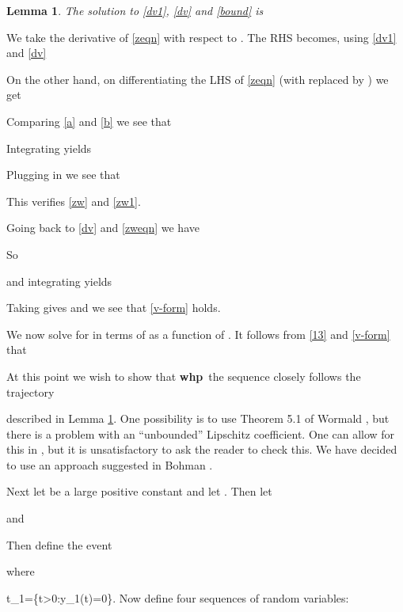 \documentclass[11pt]{article}
\newenvironment{proof}{{\bf Proof:}}{\hfill\mbox{}}
\def\whp{{\bf whp}}
\newcommand{\set}[1]{\left\{#1\right\}}
\newcommand{\ignore}[1]{}
\newtheorem{lemma}[theorem]{Lemma}
\newcommand{\beq}[1]{}
\begin{document}
\begin{lemma}\label{lemde}
The solution to \eqref{dv1}, \eqref{dv} and \eqref{bound} is

\end{lemma}
\begin{proof}
We take the derivative of \eqref{zeqn} with respect to .
The RHS becomes, using \eqref{dv1} and \eqref{dv}
 

On the other hand, on differentiating the LHS of \eqref{zeqn} (with  replaced by ) we get


Comparing \eqref{a} and \eqref{b} we see that


Integrating yields


Plugging in  we see that 

This verifies \eqref{zw} and \eqref{zw1}.

Going back to \eqref{dv} and \eqref{zweqn} we have 

So 
 
and integrating yields

Taking  gives 
and we see that \eqref{v-form} holds.

{\large
{\bf
\ignore{
Using \eqref{v-form} in \eqref{dv1} we get

Dividing through by  we get

and dividing by  and collecting  on LHS gives

Integrating with respect to  and pluggin in  gives

Do we need to derive \eqref{v1-form}? It is not used for the next derivation.
}
}
}

We now solve for  in terms of  as a function of . It follows from \eqref{13} and 
\eqref{v-form} that

\end{proof}

At this point we wish to show that \whp\ the sequence  closely follows the trajectory

described in Lemma \ref{lemde}. One possibility is to use Theorem 5.1 of Wormald \cite{Wormald}, but there
is a problem with an ``unbounded'' Lipschitz coefficient. 
One can allow for this in \cite{Wormald}, but it is unsatisfactory to ask the reader to 
check this. We have decided to use an approach suggested in Bohman \cite{r3t}. 

Next let  be a large positive constant and let .
Then let

and

Then define the event

where 
\beq{t1}
t_1=\min\set{t>0:\;y_1(t)=0}.
\eeq
Now define four sequences of random variables: 
\end{document}
